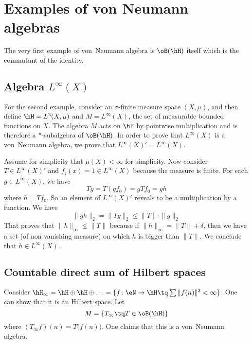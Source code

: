 \section{Examples of von Neumann algebras}

The very first example of von~Neumann algebra is $\oB(\hH)$ itself which is the commutant of the identity.

\subsection{Algebra \texorpdfstring{$L^{\infty}(X)$}{LX}}


For the second example, consider an $\sigma$-finite measure space $(X,\mu)$, and then define $\hH=L^2(X,\mu)$ and $M=L^{\infty}(X)$, the set of measurable bounded functions on $X$. The algebra $M$ acts on $\hH$ by pointwise multiplication and is therefore a $*$-subalgebra of $\oB(\hH)$. In order to prove that $ L^{\infty}(X)$ is a von~Neumann algebra, we prove that $ L^{\infty}(X)'= L^{\infty}(X)$.

Assume for simplicity that $\mu(X)<\infty$ for simplicity. Now consider $T\in L^{\infty}(X)'$ and $f_)(x)=1\in L^{\infty}(X)$ because the measure is finite. For each $g\in L^{\infty}(X)$, we have
\[
	Tg=T(gf_0)=gTf_0=gh
\]
where $h=Tf_0$. So an element of $ L^{\infty}(X)'$ reveals to be a multiplication by a function. We have
\[
	\| gh \|_2=\| Tg \|_2\leq \| T \|\cdot \| g \|_2
\]
That proves that $\| h \|_{\infty}\leq \| T \|$ because if $\| h \|_{\infty}=\| T \|+\delta$, then we have a set (of non vanishing measure) on which $h$ is bigger than $\| T \|$. We conclude that $h\in L^{\infty}(X)$.

\subsection{Countable direct sum of Hilbert spaces}

Consider $\hH_{\infty}=\hH\oplus\hH\oplus\ldots=\{ f\colon \eN\to \hH\tq \sum \| f(n) \|^2<\infty \}$. One can show that it is an Hilbert space. Let
\[
	M=\{ T_{\infty}\tq T\in\oB(\hH) \}
\]
where $(T_{\infty}f)(n)=T\big( f(n) \big)$. One claims that this is a von~Neumann algebra.

